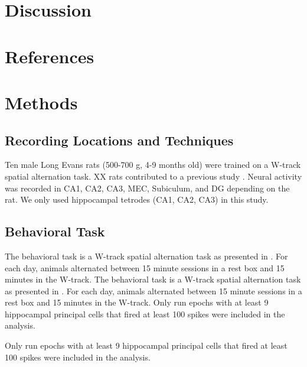 \documentclass[times, twoside]{zHenriquesLab-StyleBioRxiv}
\begin{document}
\section*{Discussion}


\begin{acknowledgements}
\end{acknowledgements}

\section*{References}


\onecolumn
\newpage

\section*{Methods}
\subsection*{Recording Locations and Techniques}
Ten male Long Evans rats (500-700 g, 4-9 months old) were trained on a W-track spatial alternation task. XX rats contributed to a previous study \cite{KarlssonAwakereplayremote2009}. Neural activity was recorded in CA1, CA2, CA3, MEC, Subiculum, and DG depending on the rat. We only used hippocampal tetrodes (CA1, CA2, CA3) in this study.

\subsection*{Behavioral Task}
The behavioral task is a W-track spatial alternation task as presented in \cite{KarlssonAwakereplayremote2009}. For each day, animals alternated between 15 minute sessions in a rest box and 15 minutes in the W-track. The behavioral task is a W-track spatial alternation task as presented in \cite{KarlssonAwakereplayremote2009}. For each day, animals alternated between 15 minute sessions in a rest box and 15 minutes in the W-track. Only run epochs with at least 9 hippocampal principal cells that fired at least 100 spikes were included in the analysis.

Only run epochs with at least 9 hippocampal principal cells that fired at least 100 spikes were included in the analysis.
\end{document}
